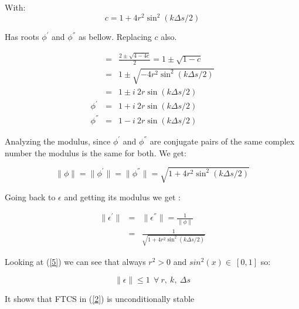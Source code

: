 \documentclass[legalpaper, 12pt]{book}
\begin{document}
With:
 $$ c = 1 +4 r^2 \sin^2 \left(k\Delta s/2 \right) $$

Has roots $ \phi^{'} $ and $ \phi^{''} $ as bellow. Replacing $c$ also.

\begin{eqnarray}
 &=& \frac{2 \pm \sqrt{4 - 4c}}{2} = 1 \pm \sqrt{1-c} \nonumber \\
 &=& 1 \pm \sqrt{-4 r^2 \sin^2 \left(k\Delta s/2 \right) } \nonumber \\
 &=& 1 \pm i \ 2 r \sin \left(k\Delta s/2 \right)  \nonumber \\
 \phi^{'} &=& 1 + i \ 2 r \sin \left(k\Delta s/2 \right)   \nonumber \\
 \phi^{''} &=& 1 - i \ 2 r \sin \left(k\Delta s/2 \right)   \nonumber
\end{eqnarray}

Analyzing the modulus, since $  \phi^{'} $ and $  \phi^{''} $ are conjugate pairs of the same complex number the modulus is the same for both.
We get:

$$ \| \phi \| = \| \phi^{'} \| = \| \phi^{''} \| = \sqrt{1+ 4 r^2 \sin ^2 \left(k\Delta s/2 \right)}$$

Going back to $\epsilon$ and getting its modulus we get :

\begin{eqnarray}
 \| \epsilon^{'} \| &=& \| \epsilon^{''} \| = \frac{1}{\| \phi  \|} \nonumber \\
 &=& \frac{1}{\sqrt{1+ 4 r^2 \sin ^2 \left(k\Delta s/2 \right)}}
 \label{5}
\end{eqnarray}

Looking at (\ref{5}) we can see that always $ r^2 > 0 $ and $ sin^2(x) \in \ [0,1] $ so:

$$ \| \epsilon \| \leq 1 \ \ \forall \ r, \ k,\ \Delta s$$

It shows that FTCS in (\ref{2}) is unconditionally stable
\end{document}
